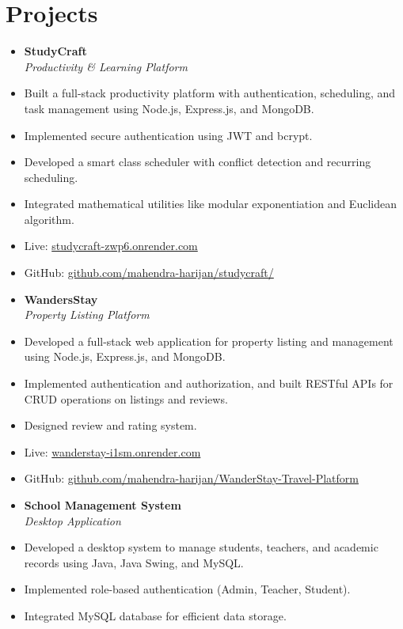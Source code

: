 \documentclass[11pt,a4paper]{article}
\begin{document}
\section*{Projects}
\begin{itemize}[noitemsep,topsep=0pt]
\item \textbf{StudyCraft} \\
\textit{Productivity & Learning Platform} \\
\item Built a full-stack productivity platform with authentication, scheduling, and task management using Node.js, Express.js, and MongoDB.
\item Implemented secure authentication using JWT and bcrypt.
\item Developed a smart class scheduler with conflict detection and recurring scheduling.
\item Integrated mathematical utilities like modular exponentiation and Euclidean algorithm.
\item Live: \href{https://studycraft-zwp6.onrender.com/}{studycraft-zwp6.onrender.com}
\item GitHub: \href{https://github.com/mahendra-harijan/studycraft/}{github.com/mahendra-harijan/studycraft/}
\item \textbf{WandersStay} \\
\textit{Property Listing Platform} \\
\item Developed a full-stack web application for property listing and management using Node.js, Express.js, and MongoDB.
\item Implemented authentication and authorization, and built RESTful APIs for CRUD operations on listings and reviews.
\item Designed review and rating system.
\item Live: \href{https://wanderstay-i1sm.onrender.com/}{wanderstay-i1sm.onrender.com}
\item GitHub: \href{https://github.com/mahendra-harijan/WanderStay-Travel-Platform}{github.com/mahendra-harijan/WanderStay-Travel-Platform}
\item \textbf{School Management System} \\
\textit{Desktop Application} \\
\item Developed a desktop system to manage students, teachers, and academic records using Java, Java Swing, and MySQL.
\item Implemented role-based authentication (Admin, Teacher, Student).
\item Integrated MySQL database for efficient data storage.
\end{itemize}
\end{document}
